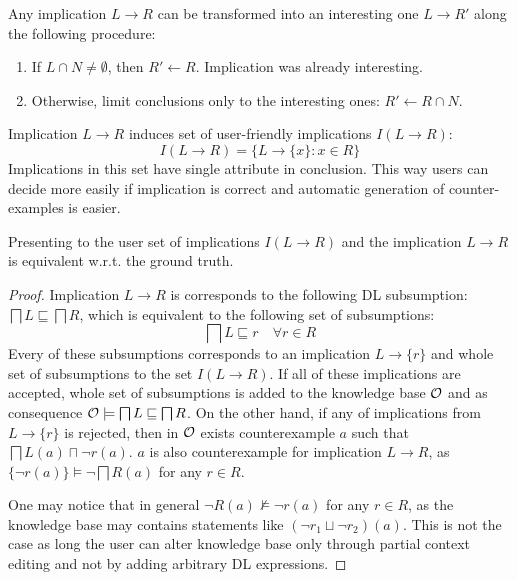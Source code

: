 \documentclass{llncs}
\newcommand{\ont}{\ensuremath\mathcal{O}}
\begin{document}
Any implication $L\to R$ can be transformed into an interesting one $L\to R'$ along the following procedure:
\begin{enumerate}
\item If $L\cap N\neq\emptyset$, then $R'\leftarrow R$. Implication was already interesting.
\item Otherwise, limit conclusions only to the interesting ones: $R'\leftarrow R\cap N$.
\end{enumerate}

\begin{definition}
Implication $L\to R$ induces set of user-friendly implications $I(L\to R)$:
\[ I(L\to R)=\{L\to\{x\}: x\in R\} \]
Implications in this set have single attribute in conclusion. This way users can decide more easily if implication is correct and automatic generation of counter-examples is easier.
\end{definition}

\begin{proposition}
Presenting to the user set of implications $I(L\to R)$ and the implication $L\to R$ is equivalent w.r.t. the ground truth. 
\end{proposition}

\begin{proof}
Implication $L\to R$ is corresponds to the following DL subsumption: $\bigsqcap L \sqsubseteq \bigsqcap R$, which is equivalent to the following set of subsumptions:
\[ \bigsqcap L \sqsubseteq r \quad \forall r\in R \]
Every of these subsumptions corresponds to an implication $L\to\{r\}$ and whole
set of subsumptions to the set $I(L\to R)$. If all of these implications are
accepted, whole set of subsumptions is added to the knowledge base $\ont$ and
as consequence $\ont\models \bigsqcap L \sqsubseteq \bigsqcap R$. On the other
hand, if any of implications from $L\to\{r\}$ is rejected, then in $\ont$
exists counterexample $a$ such that $\bigsqcap L(a) \sqcap \lnot r(a)$. $a$ is also counterexample for implication $L\to R$, as $\{\lnot r(a)\} \models \lnot\bigsqcap R(a)$ for any $r\in R$.

One may notice that in general $\lnot R(a)\not\models \lnot r(a)$ for any 
$r\in R$, as the knowledge base may contains statements like $(\lnot r_1 \sqcup
\lnot r_2)(a)$. This is not the case as long the user can alter knowledge base
only through partial context editing and not by adding arbitrary DL
expressions.  
\end{proof}
\end{document}
